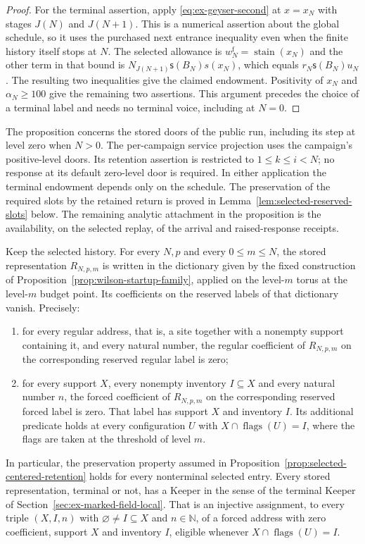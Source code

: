\begin{proof}
For the terminal assertion, apply
\eqref{eq:ex-geyser-second} at $x=x_N$ with stages $J(N)$ and $J(N+1)$.
This is a numerical assertion about the global schedule, so it uses
the purchased next entrance inequality even when the finite history
itself stops at $N$. The selected allowance is
$w_N^{\mathrm f}=\operatorname{stain}(x_N)$ and the other term in that
bound is $N_{J(N+1)}\mathsf s(B_N)s(x_N)$, which equals
$r_N\mathsf s(B_N)u_N$. The resulting two inequalities give the claimed
endowment. Positivity of $x_N$ and $\alpha_N\ge100$ give the remaining
two assertions. This argument precedes the choice of a terminal
label and needs no terminal voice, including at $N=0$.
\end{proof}

The proposition concerns the stored doors of the public run, including
its step at level zero when $N>0$. The per-campaign service projection
uses the campaign's positive-level doors. Its retention assertion
is restricted to $1\le k\le i<N$; no response at its default zero-level
door is required. In either application the terminal endowment depends
only on the schedule. The preservation of the required slots by the
retained return is proved in Lemma~\ref{lem:selected-reserved-slots}
below. The remaining analytic attachment in the proposition is the
availability, on the selected replay, of the arrival and
raised-response receipts.

\begin{lemma}
\label{lem:selected-reserved-slots}
Keep the selected history. For every $N,p$ and every $0\le m\le N$,
the stored representation $R_{N,p,m}$ is written in the dictionary given
by the fixed construction of
Proposition~\ref{prop:wilson-startup-family}, applied on the level-$m$
torus at the level-$m$ budget point. Its coefficients on the reserved
labels of that dictionary vanish. Precisely:
\begin{enumerate}
\item for every regular address, that is, a site together with a
  nonempty support containing it, and every natural number, the regular
  coefficient of $R_{N,p,m}$ on the corresponding reserved regular
  label is zero;
\item for every support $X$, every nonempty inventory $I\subseteq X$
  and every natural number $n$, the forced coefficient of $R_{N,p,m}$ on
  the corresponding reserved forced label is zero. That label has support
  $X$ and inventory $I$. Its additional predicate holds at every
  configuration $U$ with $X\cap\operatorname{flags}(U)=I$, where the
  flags are taken at the threshold of level $m$.
\end{enumerate}
In particular, the preservation property assumed in
Proposition~\ref{prop:selected-centered-retention} holds for every
nonterminal selected entry. Every stored representation, terminal or
not, has a Keeper in the sense of the terminal Keeper of
Section~\ref{sec:ex-marked-field-local}. That is an injective
assignment, to every triple $(X,I,n)$ with $\varnothing\ne I\subseteq X$
and $n\in\mathbb N$, of a forced address with zero coefficient, support
$X$ and inventory $I$, eligible whenever
$X\cap\operatorname{flags}(U)=I$.
\end{lemma}

